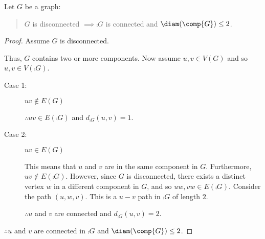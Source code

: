 \documentclass[letterpaper,12pt,fleqn]{article}
\begin{document}
\begin{theorem}
  Let \(G\) be a graph:
  \begin{quote}
    \(G\) is disconnected \(\implies\comp{G}\) is connected and \(\diam(\comp{G})\le2\).
  \end{quote}
\end{theorem}

\begin{proof}
  Assume \(G\) is disconnected.

  Thus, \(G\) contains two or more components.  Now assume \(u,v\in V(G)\) and so \(u,v\in V(\comp{G})\).
  \begin{description}
  \item[Case 1:] \(uv\notin E(G)\)

    \(\therefore uv\in E(\comp{G})\) and \(d_{\comp{G}}(u,v)=1\).
      
    \item[Case 2:] \(uv\in E(G)\)

      This means that \(u\) and \(v\) are in the same component in \(G\).  Furthermore, \(uv\notin E(\comp{G})\).
      However, since \(G\) is disconnected, there exists a distinct vertex \(w\) in a different component in \(G\),
      and so \(uw,vw\in E(\comp{G})\).  Consider the path \((u,w,v)\).  This is a \(u-v\) path in \(\comp{G}\) of
      length \(2\).

      \(\therefore u\) and \(v\) are connected and \(d_{\comp{G}}(u,v)=2\).
  \end{description}

  \(\therefore u\) and \(v\) are connected in \(\comp{G}\) and \(\diam(\comp{G})\le2\).
\end{proof}
\end{document}
